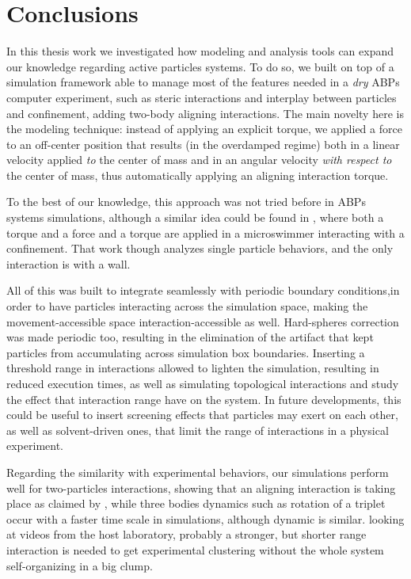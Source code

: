 \documentclass[../../master_thesis_np.tex]{subfiles}
\begin{document}
\chapter{Conclusions}

In this thesis work we investigated how modeling and analysis tools can expand our knowledge regarding active particles systems.
To do so, we built on top of a simulation framework able to manage most of the features needed in a \emph{dry} ABPs computer experiment, such as steric interactions and interplay between particles and confinement, adding two-body aligning interactions.
The main novelty here is the modeling technique: instead of applying an explicit torque, we applied a force to an off-center position that results (in the overdamped regime) both in a linear velocity applied \emph{to} the center of mass and in an angular velocity \emph{with respect to} the center of mass, thus automatically applying an aligning interaction torque.

{\color{blue} To the best of our knowledge, this approach was not tried before in ABPs systems simulations, although a similar idea could be found in \cite{ostapenko_curvature-guided_2018}, where both a torque and a force and a torque are applied in a microswimmer interacting with a confinement.
That work though analyzes single particle behaviors, and the only interaction is with a wall.}

All of this was built to integrate seamlessly with periodic boundary conditions,in order to have particles interacting across the simulation space, making the movement-accessible space interaction-accessible as well.
Hard-spheres correction was made periodic too, resulting in the elimination of the artifact that kept particles from accumulating across simulation box boundaries.
Inserting a threshold range in interactions allowed to lighten the simulation, resulting in reduced execution times, as well as simulating topological interactions and study the effect that interaction range have on the system.
In future developments, this could be useful to insert screening effects that particles may exert on each other, as well as solvent-driven ones, that limit the range of interactions in a physical experiment.

Regarding the similarity with experimental behaviors, our simulations perform well for two-particles interactions, showing that an aligning interaction is taking place as claimed by \cite{singh_pair_2024}, while three bodies dynamics such as rotation of a triplet occur with a faster time scale in simulations, although dynamic is similar.
looking at videos from the host laboratory, probably a stronger, but shorter range interaction is needed to get experimental clustering without the whole system self-organizing in a big clump.
\end{document}

